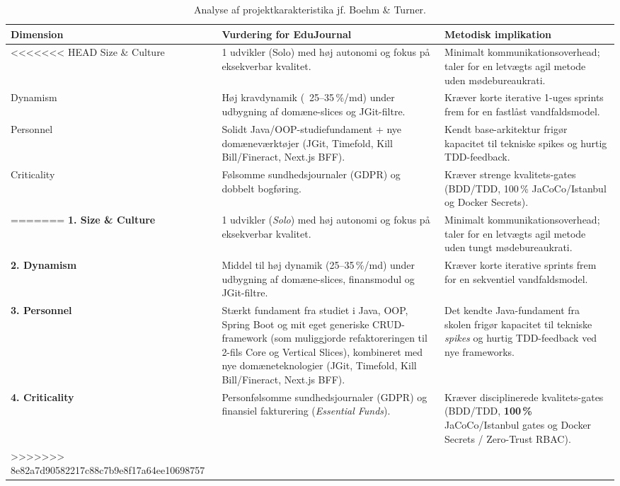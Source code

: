 \documentclass[11pt,a4paper]{article}
\begin{document}
\begin{table}[htbp]
\begin{table}[htbp]
\centering
\small
\begin{tabularx}{\textwidth}{P{3.0cm} Y Y}
\toprule
\textbf{Dimension} & \textbf{Vurdering for EduJournal} & \textbf{Metodisk implikation} \\
\midrule
<<<<<<< HEAD
Size \& Culture & 1 udvikler (Solo) med høj autonomi og fokus på eksekverbar kvalitet. & Minimalt kommunikationsoverhead; taler for en letvægts agil metode uden mødebureaukrati. \\
Dynamism & Høj kravdynamik (~25--35\,\%/md) under udbygning af domæne-slices og JGit-filtre. & Kræver korte iterative 1-uges sprints frem for en fastlåst vandfaldsmodel. \\
Personnel & Solidt Java/OOP-studiefundament + nye domæneværktøjer (JGit, Timefold, Kill Bill/Fineract, Next.js BFF). & Kendt base-arkitektur frigør kapacitet til tekniske spikes og hurtig TDD-feedback. \\
Criticality & Følsomme sundhedsjournaler (GDPR) og dobbelt bogføring. & Kræver strenge kvalitets-gates (BDD/TDD, 100\,\% JaCoCo/Istanbul og Docker Secrets). \\
=======
\textbf{1. Size \& Culture} & 1 udvikler (\textit{Solo}) med høj autonomi og fokus på eksekverbar kvalitet. & Minimalt kommunikationsoverhead; taler for en letvægts agil metode uden tungt mødebureaukrati. \\
\addlinespace
\textbf{2. Dynamism} & Middel til høj dynamik (25--35\,\%/md) under udbygning af domæne-slices, finansmodul og JGit-filtre. & Kræver korte iterative sprints frem for en sekventiel vandfaldsmodel. \\
\addlinespace
\textbf{3. Personnel} & Stærkt fundament fra studiet i Java, OOP, Spring Boot og mit eget generiske CRUD-framework (som muliggjorde refaktoreringen til 2-fils Core og Vertical Slices), kombineret med nye domæneteknologier (JGit, Timefold, Kill Bill/Fineract, Next.js BFF). & Det kendte Java-fundament fra skolen frigør kapacitet til tekniske \textit{spikes} og hurtig TDD-feedback ved nye frameworks. \\
\addlinespace
\textbf{4. Criticality} & Personfølsomme sundhedsjournaler (GDPR) og finansiel fakturering (\textit{Essential Funds}). & Kræver disciplinerede kvalitets-gates (BDD/TDD, \textbf{100\,\%} JaCoCo/Istanbul gates og Docker Secrets / Zero-Trust RBAC). \\
>>>>>>> 8e82a7d90582217c88c7b9e8f17a64ee10698757
\bottomrule
\end{tabularx}
\caption{Analyse af projektkarakteristika jf. Boehm \& Turner.}
\label{tab:boehm_turner_table}
\end{table}


\end{table}
\end{document}
